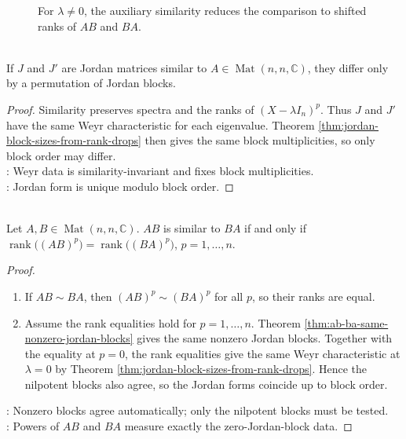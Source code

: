 \begin{figure}[H]
  \centering
  
  \caption{For $\lambda\neq0$, the auxiliary similarity reduces the comparison to shifted ranks of $AB$ and $BA$.}
  \label{fig:ab-ba-nonzero-jordan-blocks}
\end{figure}

\begin{corollary} \label{cor:jordan-form-unique-up-to-block-permutation} \\
If $J$ and $J'$ are Jordan matrices similar to $A\in\operatorname{Mat}(n,n,\mathbb{C})$, they differ only by a permutation of Jordan blocks.
\begin{proof}
Similarity preserves spectra and the ranks of $(X-\lambda I_n)^p$. Thus $J$ and $J'$ have the same Weyr characteristic for each eigenvalue. Theorem \ref{thm:jordan-block-sizes-from-rank-drops} then gives the same block multiplicities, so only block order may differ.\\
: Weyr data is similarity-invariant and fixes block multiplicities.\\
: Jordan form is unique modulo block order.
\end{proof}
\end{corollary}

\begin{corollary} \label{cor:ab-ba-similar-rank-power-criterion} \\
Let $A,B\in\operatorname{Mat}(n,n,\mathbb{C})$. $AB$ is similar to $BA$ if and only if $\operatorname{rank}\bigl((AB)^p\bigr)=\operatorname{rank}\bigl((BA)^p\bigr)$, $p=1,\ldots,n$.
\begin{proof}
\begin{enumerate}[label=\roman*.]
\setlength{\itemsep}{0pt}
\item[$(\Rightarrow)$]
If $AB\sim BA$, then $(AB)^p\sim(BA)^p$ for all $p$, so their ranks are equal.
\item[$(\Leftarrow)$]
Assume the rank equalities hold for $p=1,\ldots,n$. Theorem \ref{thm:ab-ba-same-nonzero-jordan-blocks} gives the same nonzero Jordan blocks. Together with the equality at $p=0$, the rank equalities give the same Weyr characteristic at $\lambda=0$ by Theorem \ref{thm:jordan-block-sizes-from-rank-drops}. Hence the nilpotent blocks also agree, so the Jordan forms coincide up to block order.
\end{enumerate}
: Nonzero blocks agree automatically; only the nilpotent blocks must be tested.\\
: Powers of $AB$ and $BA$ measure exactly the zero-Jordan-block data.
\end{proof}
\end{corollary}

